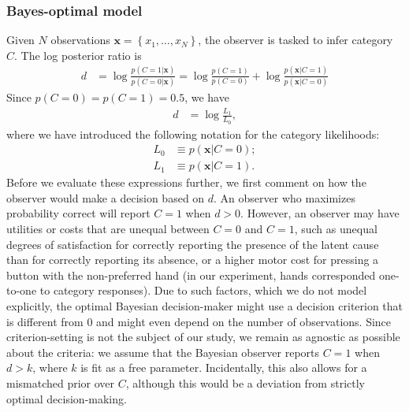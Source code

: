 \documentclass{article}
\begin{document}
\subsubsection*{Bayes-optimal model}
Given $N$ observations $\mathbf{x}=\left\{x_1, \dots, x_N\right\}$, the observer is tasked to infer category $C$. The log posterior ratio is
\begin{align}
d &= \log \frac{p(C=1|\mathbf{x})}{p(C=0|\mathbf{x})} = \log \frac{p(C=1)}{p(C=0)} + \log \frac{p(\mathbf{x}|C=1)}{p(\mathbf{x}|C=0)}
\end{align}
Since $p(C=0) = p(C=1) = 0.5$, we have 
\begin{align}
d &= \log \frac{L_1}{L_0},
\end{align}
where we have introduced the following notation for the category likelihoods:
\begin{align}
L_0 & \equiv p(\mathbf{x}|C=0);\\
L_1 & \equiv p(\mathbf{x}|C=1).\label{l1}
\end{align}
Before we evaluate these expressions further, we first comment on how the observer would make a decision based on $d$. An observer who maximizes probability correct will report $C=1$ when $d>0$. However, an observer may have utilities or costs that are unequal between $C=0$ and $C=1$, such as unequal degrees of satisfaction for correctly reporting the presence of the latent cause than for correctly reporting its absence, or a higher motor cost for pressing a button with the non-preferred hand (in our experiment, hands corresponded one-to-one to category responses). Due to such factors, which we do not model explicitly, the optimal Bayesian decision-maker might use a decision criterion that is different from 0 and might even depend on the number of observations. Since criterion-setting is not the subject of our study, we remain as agnostic as possible about the criteria: we assume that the Bayesian observer reports $C=1$ when $d>k$, where $k$ is fit as a free parameter.  Incidentally, this also allows for a mismatched prior over $C$, although this would be a deviation from strictly optimal decision-making. 
\end{document}
